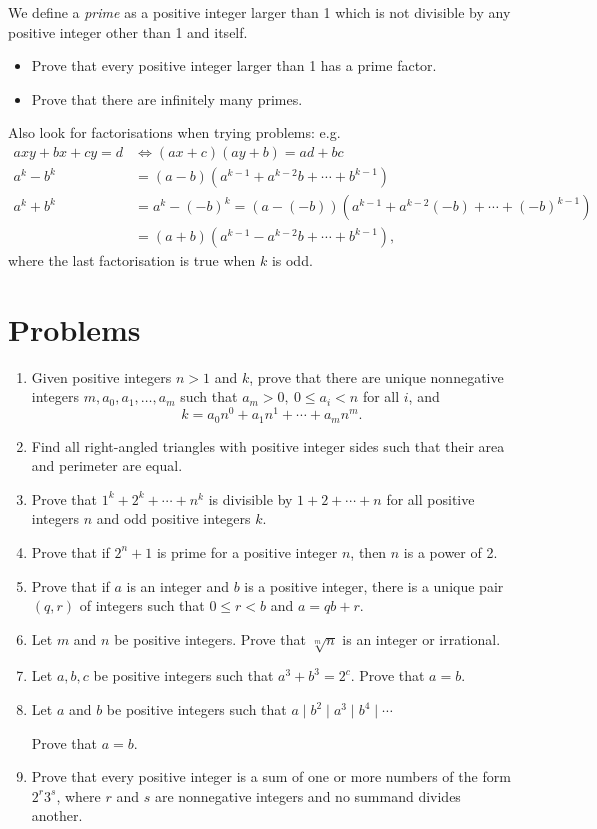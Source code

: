 \documentclass{article}
\begin{document}
We define a \emph{prime} as a positive integer larger than 1 which is not
divisible by any positive integer other than 1 and itself.
\begin{itemize}
	\item Prove that every positive integer larger than 1 has a prime factor.
	\item Prove that there are infinitely many primes.
\end{itemize}
Also look for factorisations when trying problems: e.g.
\begin{align*}
	axy+bx+cy=d & \iff (ax+c)(ay+b)=ad+bc                                     \\
	a^k-b^k     & =(a-b)\left(a^{k-1}+a^{k-2}b+\cdots+b^{k-1}\right)          \\
	a^k+b^k     & =a^k-(-b)^k=(a-(-b))(a^{k-1}+a^{k-2}(-b)+\cdots+(-b)^{k-1}) \\
	            & =(a+b)(a^{k-1}-a^{k-2}b+\cdots+b^{k-1}),
\end{align*}
where the last factorisation is true when $k$ is odd.
\section{Problems}
\begin{enumerate}
	\item Given positive integers $n>1$ and $k$, prove that there are unique
	      nonnegative integers $m,a_0,a_1,\ldots,a_m$ such that $a_m>0,\ 0\le
		      a_i<n$ for all $i$, and
	      \[k=a_0 n^0+a_1 n^1+\cdots+a_m n^m.\]
	\item Find all right-angled triangles with positive integer sides
	      such that their area and perimeter are equal.
	\item Prove that $1^k+2^k+\cdots+n^k$ is divisible by $1+2+\cdots+n$ for
	      all positive integers $n$ and odd positive integers $k$.
	\item Prove that if $2^n+1$ is prime for a positive integer $n$, then $n$ is
	      a power of 2.
	\item Prove that if $a$ is an integer and $b$ is a positive integer, there
	      is a unique pair $(q,r)$ of integers such that $0\le r<b$ and $a=qb+r$.
	\item Let $m$ and $n$ be positive integers. Prove that $\sqrt[m]n$ is an
	      integer or irrational.
	\item Let $a,b,c$ be positive integers such that $a^3+b^3=2^c$. Prove that
	      $a=b$.
	\item Let $a$ and $b$ be positive integers such that $a\mid b^2\mid a^3\mid
		      b^4\mid\cdots$

	      Prove that $a=b$.
	\item Prove that every positive integer is a sum of one or more numbers of
	      the form $2^r3^s$, where $r$ and $s$ are nonnegative integers and no
	      summand divides another.
\end{enumerate}
\newpage
\end{document}

